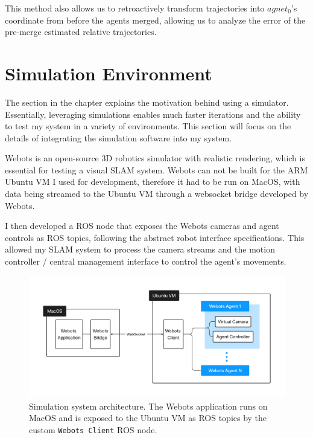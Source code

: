 This method also allows us to retroactively transform trajectories into $agnet_0$'s coordinate from before the agents merged, allowing us to analyze the error of the pre-merge estimated relative trajectories.

\section{Simulation Environment}
\label{sec:simulation-environment}
The  section in the  chapter explains the motivation behind using a simulator. Essentially, leveraging simulations enables much faster iterations and the ability to test my system in a variety of environments. This section will focus on the details of integrating the simulation software into my system.

Webots is an open-source 3D robotics simulator with realistic rendering, which is essential for testing a visual SLAM system. Webots can not be built for the ARM Ubuntu VM I used for development, therefore it had to be run on MacOS, with data being streamed to the Ubuntu VM through a websocket bridge developed by Webots.

I then developed a ROS node that exposes the Webots cameras and agent controls as ROS topics, following the abstract robot interface specifications. This allowed my SLAM system to process the camera streams and the motion controller / central management interface to control the agent's movements.


\begin{figure}[h]
    \centering
    \includegraphics[trim=5cm 5cm 5cm 5cm, scale=0.18]{figures/simulation_environment.pdf}

    \caption{Simulation system architecture. The Webots application runs on MacOS and is exposed to the Ubuntu VM as ROS topics by the custom \texttt{Webots Client} ROS node.}
    \label{fig:simulation-environment}
\end{figure}

